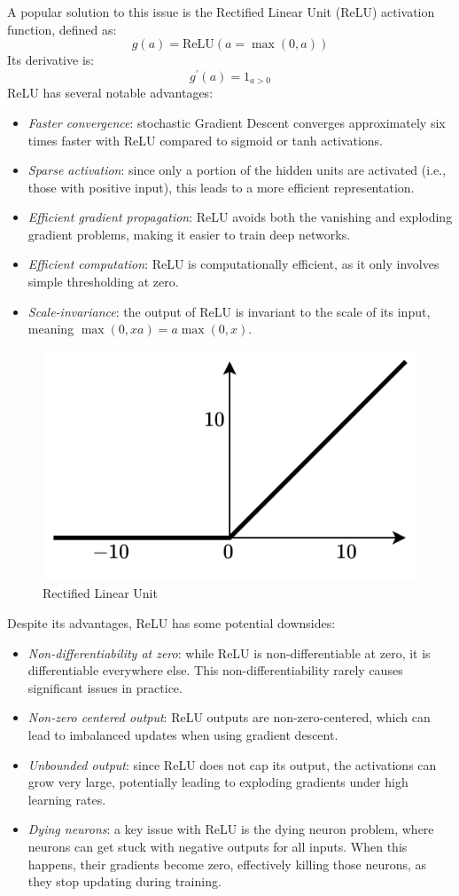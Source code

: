 A popular solution to this issue is the Rectified Linear Unit (ReLU) activation function, defined as:
\[g(a)=\text{ReLU}(a=\max(0,a))\]
Its derivative is:
\[g^\prime(a)=1_{a>0}\]
ReLU has several notable advantages:
\begin{itemize}
    \item \textit{Faster convergence}: stochastic Gradient Descent converges approximately six times faster with ReLU compared to sigmoid or tanh activations.
    \item \textit{Sparse activation}: since only a portion of the hidden units are activated (i.e., those with positive input), this leads to a more efficient representation.
    \item \textit{Efficient gradient propagation}: ReLU avoids both the vanishing and exploding gradient problems, making it easier to train deep networks.
    \item \textit{Efficient computation}: ReLU is computationally efficient, as it only involves simple thresholding at zero.
    \item \textit{Scale-invariance}: the output of ReLU is invariant to the scale of its input, meaning $\max(0,xa)=a\max(0,x)$.
\end{itemize}
\begin{figure}[H]
    \centering
    \includegraphics[width=0.5\linewidth]{images/relu.png}
    \caption{Rectified Linear Unit}
\end{figure}
Despite its advantages, ReLU has some potential downsides:
\begin{itemize}
    \item \textit{Non-differentiability at zero}: while ReLU is non-differentiable at zero, it is differentiable everywhere else. 
        This non-differentiability rarely causes significant issues in practice.
    \item \textit{Non-zero centered output}: ReLU outputs are non-zero-centered, which can lead to imbalanced updates when using gradient descent.
    \item \textit{Unbounded output}: since ReLU does not cap its output, the activations can grow very large, potentially leading to exploding gradients under high learning rates.
    \item \textit{Dying neurons}: a key issue with ReLU is the dying neuron problem, where neurons can get stuck with negative outputs for all inputs. 
        When this happens, their gradients become zero, effectively killing those neurons, as they stop updating during training.
\end{itemize}

